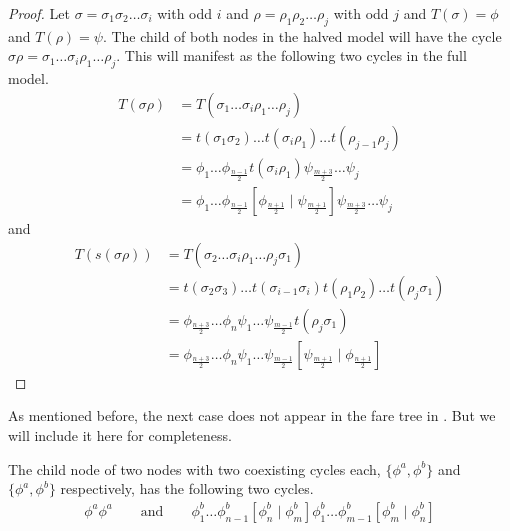 \begin{proof}
    Let $\sigma = \sigma_1\sigma_2 \dots \sigma_i$ with odd $i$ and $\rho = \rho_1\rho_2 \dots \rho_j$ with odd $j$ and $T(\sigma) = \phi$ and $T(\rho) = \psi$.
    The child of both nodes in the halved model will have the cycle $\sigma\rho = \sigma_1 \dots \sigma_i \rho_1 \dots \rho_j$.
    This will manifest as the following two cycles in the full model.
    \begin{align*}
        T(\sigma\rho) & = T(\sigma_1 \dots \sigma_i \rho_1 \dots \rho_j)                                                                                  \\
                      & = t(\sigma_1\sigma_2) \dots t(\sigma_i\rho_1) \dots t(\rho_{j-1}\rho_j)                                                           \\
                      & = \phi_1 \dots \phi_{\frac{n-1}{2}} t(\sigma_i\rho_1) \psi_{\frac{m+3}{2}} \dots \psi_j                                           \\
                      & = \phi_1 \dots \phi_{\frac{n-1}{2}} \left[\phi_{\frac{n+1}{2}} \mid \psi_{\frac{m+1}{2}}\right] \psi_{\frac{m+3}{2}} \dots \psi_j
    \end{align*}
    and
    \begin{align*}
        T(s(\sigma\rho)) & = T(\sigma_2 \dots \sigma_i \rho_1 \dots \rho_j \sigma_1)                                                                         \\
                         & = t(\sigma_2\sigma_3) \dots t(\sigma_{i-1}\sigma_i) t(\rho_1\rho_2) \dots t(\rho_j\sigma_1)                                       \\
                         & = \phi_{\frac{n+3}{2}} \dots \phi_n \psi_1 \dots \psi_{\frac{m-1}{2}} t(\rho_j\sigma_1)                                           \\
                         & = \phi_{\frac{n+3}{2}} \dots \phi_n \psi_1 \dots \psi_{\frac{m-1}{2}} \left[\psi_{\frac{m+1}{2}} \mid \phi_{\frac{n+1}{2}}\right]
    \end{align*}
\end{proof}


As mentioned before, the next case does not appear in the fare tree in .
But we will include it here for completeness.

\begin{theorem}
    The child node of two nodes with two coexisting cycles each, $\{\phi^a, \phi^b\}$ and $\{\phi^a, \phi^b\}$ respectively, has the following two cycles.
    \begin{align*}
        \phi^a\phi^a \qquad \text{and} \qquad
        \phi^b_1 \dots \phi^b_{n-1} \left[\phi^b_n \mid \phi^b_m\right] \phi^b_1 \dots \phi^b_{m-1} \left[\phi^b_m \mid \phi^b_n\right]
    \end{align*}
\end{theorem}

